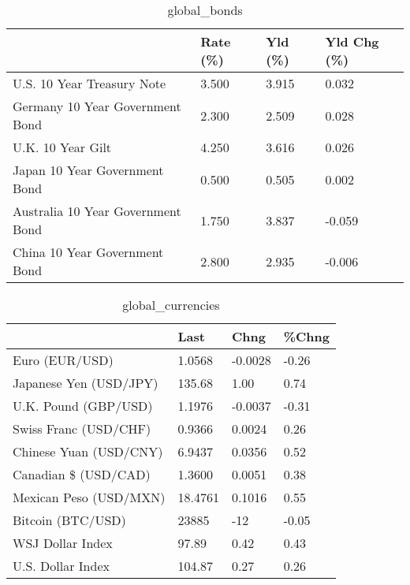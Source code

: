 \documentclass{article}%
\begin{document}
%


\begin{table}[htbp]%
\caption{global\_bonds}%
\centering%
\begin{adjustbox}{width=1\textwidth}%
\begin{tabular}{llll}
\toprule
                                  & Rate (\%) & Yld (\%) & Yld Chg (\%) \\
\midrule
       U.S. 10 Year Treasury Note &    3.500 &   3.915 &       0.032 \\
  Germany 10 Year Government Bond &    2.300 &   2.509 &       0.028 \\
                U.K. 10 Year Gilt &    4.250 &   3.616 &       0.026 \\
    Japan 10 Year Government Bond &    0.500 &   0.505 &       0.002 \\
Australia 10 Year Government Bond &    1.750 &   3.837 &      -0.059 \\
    China 10 Year Government Bond &    2.800 &   2.935 &      -0.006 \\
\bottomrule
\end{tabular}
%
\end{adjustbox}%
\end{table}

%


\begin{table}[htbp]%
\caption{global\_currencies}%
\centering%
\begin{adjustbox}{width=1\textwidth}%
\begin{tabular}{llll}
\toprule
                       &    Last &    Chng & \%Chng \\
\midrule
        Euro (EUR/USD) &  1.0568 & -0.0028 & -0.26 \\
Japanese Yen (USD/JPY) &  135.68 &    1.00 &  0.74 \\
  U.K. Pound (GBP/USD) &  1.1976 & -0.0037 & -0.31 \\
 Swiss Franc (USD/CHF) &  0.9366 &  0.0024 &  0.26 \\
Chinese Yuan (USD/CNY) &  6.9437 &  0.0356 &  0.52 \\
  Canadian \$ (USD/CAD) &  1.3600 &  0.0051 &  0.38 \\
Mexican Peso (USD/MXN) & 18.4761 &  0.1016 &  0.55 \\
     Bitcoin (BTC/USD) &   23885 &     -12 & -0.05 \\
      WSJ Dollar Index &   97.89 &    0.42 &  0.43 \\
     U.S. Dollar Index &  104.87 &    0.27 &  0.26 \\
\bottomrule
\end{tabular}
%
\end{adjustbox}%
\end{table}
\end{document}
